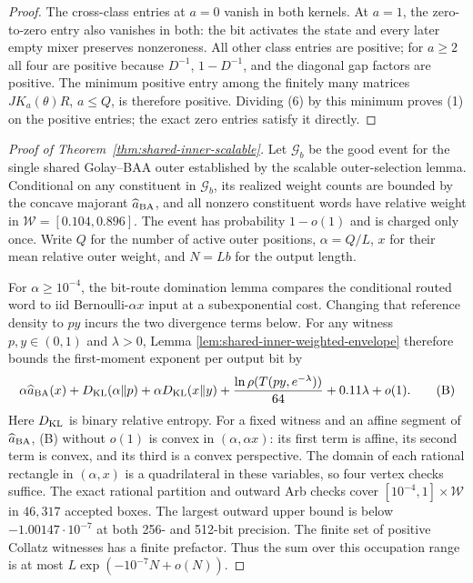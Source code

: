 \begin{proof}
The cross-class entries at $a=0$ vanish in both kernels. At $a=1$,
the zero-to-zero entry also vanishes in both: the bit activates the
state and every later empty mixer preserves nonzeroness. All other
class entries are positive; for $a\ge2$ all four are positive because
$D^{-1}$, $1-D^{-1}$, and the diagonal gap factors are positive.
The minimum positive entry among the finitely many matrices
$JK_a(\theta)R$, $a\le Q$, is therefore positive. Dividing (6) by
this minimum proves (1) on the positive entries; the exact zero
entries satisfy it directly.
\end{proof}

\begin{proof}[Proof of Theorem~\ref{thm:shared-inner-scalable}]
Let $\mathcal G_b$ be the good event for the single shared Golay--BAA
outer established by the scalable outer-selection lemma. Conditional
on any constituent in $\mathcal G_b$, its realized weight counts are
bounded by the concave majorant $\widehat a_{\rm BA}$, and all nonzero
constituent words have relative weight in
$\mathcal W=[0.104,0.896]$. The event has probability $1-o(1)$ and is
charged only once. Write $Q$ for the number of active outer positions,
$\alpha=Q/L$, $x$ for their mean relative outer weight, and
$N=Lb$ for the output length.

For $\alpha\ge10^{-4}$, the bit-route domination lemma compares the
conditional routed word to iid Bernoulli-$\alpha x$ input at a
subexponential cost. Changing that reference density to $py$ incurs
the two divergence terms below. For any witness $p,y\in(0,1)$ and
$\lambda>0$, Lemma
\ref{lem:shared-inner-weighted-envelope} therefore bounds the
first-moment exponent per output bit by
\[
 \alpha\widehat a_{\rm BA}(x)
 +D_{\rm KL}(\alpha\Vert p)+\alpha D_{\rm KL}(x\Vert y)
 +\frac{\ln\rho(T(py,e^{-\lambda}))}{64}+0.11\lambda+o(1).
 \tag{B}
\]
Here $D_{\rm KL}$ is binary relative entropy. For a fixed witness and
an affine segment of $\widehat a_{\rm BA}$, (B) without $o(1)$ is
convex in $(\alpha,\alpha x)$: its first term is affine, its second
term is convex, and its third is a convex perspective. The domain of
each rational rectangle in $(\alpha,x)$ is a quadrilateral in these
variables, so four vertex checks suffice. The exact rational
partition and outward Arb checks cover
$[10^{-4},1]\times\mathcal W$ in $46{,}317$ accepted boxes. The
largest outward upper bound is below $-1.00147\cdot10^{-7}$ at both
256- and 512-bit precision. The finite set of positive Collatz
witnesses has a finite prefactor. Thus the sum over this occupation
range is at most $L\exp(-10^{-7}N+o(N))$.


\end{proof}

